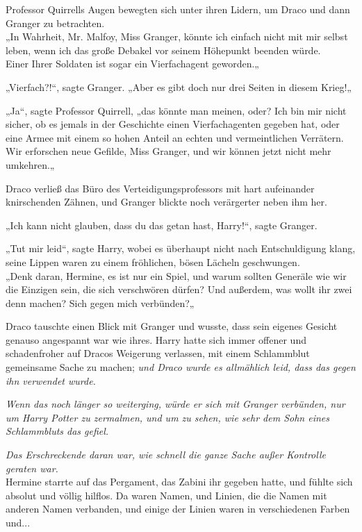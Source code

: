 {Professor Quirrells Augen bewegten sich unter ihren Lidern, um Draco und dann Granger zu betrachten.\\ „In Wahrheit, Mr. Malfoy, Miss Granger, könnte ich einfach nicht mit mir selbst leben, wenn ich das große Debakel vor seinem Höhepunkt beenden würde.\\ Einer Ihrer Soldaten ist sogar ein Vierfachagent geworden.„

„Vierfach?!“, sagte Granger. „Aber es gibt doch nur drei Seiten in diesem Krieg!„

„Ja“, sagte Professor Quirrell, „das könnte man meinen, oder? Ich bin mir nicht sicher, ob es jemals in der Geschichte einen Vierfachagenten gegeben hat, oder eine Armee mit einem so hohen Anteil an echten und vermeintlichen Verrätern.\\ Wir erforschen neue Gefilde, Miss Granger, und wir können jetzt nicht mehr umkehren.„

Draco verließ das Büro des Verteidigungsprofessors mit hart aufeinander knirschenden Zähnen, und Granger blickte noch verärgerter neben ihm her.

„Ich kann nicht glauben, dass du das getan hast, Harry!“, sagte Granger.

„Tut mir leid“, sagte Harry, wobei es überhaupt nicht nach Entschuldigung klang, seine Lippen waren zu einem fröhlichen, bösen Lächeln geschwungen.\\ „Denk daran, Hermine, es ist nur ein Spiel, und warum sollten Generäle wie wir die Einzigen sein, die sich verschwören dürfen? Und außerdem, was wollt ihr zwei denn machen? Sich gegen mich verbünden?„

Draco tauschte einen Blick mit Granger und wusste, dass sein eigenes Gesicht genauso angespannt war wie ihres. Harry hatte sich immer offener und schadenfroher auf Dracos Weigerung verlassen, mit einem Schlammblut gemeinsame Sache zu machen; \emph{und Draco wurde es allmählich leid, dass das gegen ihn verwendet wurde.}

\emph{Wenn das noch länger so weiterging, würde er sich mit Granger verbünden, nur um Harry Potter zu zermalmen, und um zu sehen, wie sehr dem Sohn eines Schlammbluts das gefiel.}

\emph{Das Erschreckende daran war, wie schnell die ganze Sache außer Kontrolle geraten war.}\\ Hermine starrte auf das Pergament, das Zabini ihr gegeben hatte, und fühlte sich absolut und völlig hilflos. Da waren Namen, und Linien, die die Namen mit anderen Namen verbanden, und einige der Linien waren in verschiedenen Farben und...

}
